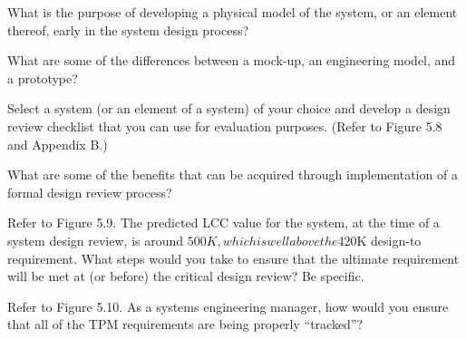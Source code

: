 \begin{exercises}
    \begin{exercise}
    \label{sea-05-12}
        What is the purpose of developing a physical model of the system, or an element thereof, early in the system design process?
    \end{exercise}
    \begin{solution}
    \end{solution}
    
    \begin{exercise}
    \label{sea-05-13}
        What are some of the differences between a mock-up, an engineering model, and a prototype?
    \end{exercise}
    \begin{solution}
    \end{solution}
    
    \begin{exercise}
    \label{sea-05-14}
        Select a system (or an element of a system) of your choice and develop a design review checklist that you can use for evaluation purposes. (Refer to Figure 5.8 and Appendix B.)
    \end{exercise}
    \begin{solution}
    \end{solution}
    
    \begin{exercise}
    \label{sea-05-15}
        What are some of the benefits that can be acquired through implementation of a formal design review process?
    \end{exercise}
    \begin{solution}
    \end{solution}
    
    \begin{exercise}
    \label{sea-05-16}
        Refer to Figure 5.9. The predicted LCC value for the system, at the time of a system design review, is around $500K, which is well above the $420K design-to requirement. What steps would you take to ensure that the ultimate requirement will be met at (or before) the critical design review? Be specific.
    \end{exercise}
    \begin{solution}
    \end{solution}
    
    \begin{exercise}
    \label{sea-05-17}
        Refer to Figure 5.10. As a systems engineering manager, how would you ensure that all of the TPM requirements are being properly “tracked”?
    \end{exercise}
    \begin{solution}
    \end{solution}
    

\end{exercises}
